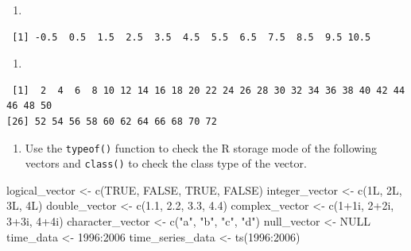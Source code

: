 \documentclass[
  letterpaper,
  DIV=11,
  numbers=noendperiod]{scrreprt}
\newenvironment{Shaded}{\begin{snugshade}}{\end{snugshade}}
\newcommand{\ConstantTok}[1]{\textcolor[rgb]{0.56,0.35,0.01}{#1}}
\newcommand{\DecValTok}[1]{\textcolor[rgb]{0.68,0.00,0.00}{#1}}
\newcommand{\FloatTok}[1]{\textcolor[rgb]{0.68,0.00,0.00}{#1}}
\newcommand{\FunctionTok}[1]{\textcolor[rgb]{0.28,0.35,0.67}{#1}}
\newcommand{\NormalTok}[1]{\textcolor[rgb]{0.00,0.23,0.31}{#1}}
\newcommand{\OtherTok}[1]{\textcolor[rgb]{0.00,0.23,0.31}{#1}}
\newcommand{\SpecialCharTok}[1]{\textcolor[rgb]{0.37,0.37,0.37}{#1}}
\newcommand{\StringTok}[1]{\textcolor[rgb]{0.13,0.47,0.30}{#1}}
\providecommand{\tightlist}{%
  \setlength{\itemsep}{0pt}\setlength{\parskip}{0pt}}\usepackage{longtable,booktabs,array}
\begin{document}
\begin{enumerate}
\def\labelenumi{\roman{enumi}.}
\setcounter{enumi}{6}
\tightlist
\item
\end{enumerate}

\begin{verbatim}
 [1] -0.5  0.5  1.5  2.5  3.5  4.5  5.5  6.5  7.5  8.5  9.5 10.5
\end{verbatim}

\begin{enumerate}
\def\labelenumi{\roman{enumi}.}
\setcounter{enumi}{7}
\tightlist
\item
\end{enumerate}

\begin{verbatim}
 [1]  2  4  6  8 10 12 14 16 18 20 22 24 26 28 30 32 34 36 38 40 42 44 46 48 50
[26] 52 54 56 58 60 62 64 66 68 70 72
\end{verbatim}

\begin{enumerate}
\def\labelenumi{\arabic{enumi}.}
\setcounter{enumi}{1}
\tightlist
\item
  Use the \texttt{typeof()} function to check the R storage mode of the
  following vectors and \texttt{class()} to check the class type of the
  vector.
\end{enumerate}

\begin{Shaded}
\begin{Highlighting}[]
\NormalTok{logical\_vector }\OtherTok{\textless{}{-}} \FunctionTok{c}\NormalTok{(}\ConstantTok{TRUE}\NormalTok{, }\ConstantTok{FALSE}\NormalTok{, }\ConstantTok{TRUE}\NormalTok{, }\ConstantTok{FALSE}\NormalTok{)}
\NormalTok{integer\_vector }\OtherTok{\textless{}{-}} \FunctionTok{c}\NormalTok{(}\DecValTok{1}\NormalTok{L, }\DecValTok{2}\NormalTok{L, }\DecValTok{3}\NormalTok{L, }\DecValTok{4}\NormalTok{L)}
\NormalTok{double\_vector }\OtherTok{\textless{}{-}} \FunctionTok{c}\NormalTok{(}\FloatTok{1.1}\NormalTok{, }\FloatTok{2.2}\NormalTok{, }\FloatTok{3.3}\NormalTok{, }\FloatTok{4.4}\NormalTok{)}
\NormalTok{complex\_vector }\OtherTok{\textless{}{-}} \FunctionTok{c}\NormalTok{(}\DecValTok{1}\SpecialCharTok{+}\DecValTok{1}\NormalTok{i, }\DecValTok{2}\SpecialCharTok{+}\DecValTok{2}\NormalTok{i, }\DecValTok{3}\SpecialCharTok{+}\DecValTok{3}\NormalTok{i, }\DecValTok{4}\SpecialCharTok{+}\DecValTok{4}\NormalTok{i)}
\NormalTok{character\_vector }\OtherTok{\textless{}{-}} \FunctionTok{c}\NormalTok{(}\StringTok{"a"}\NormalTok{, }\StringTok{"b"}\NormalTok{, }\StringTok{"c"}\NormalTok{, }\StringTok{"d"}\NormalTok{)}
\NormalTok{null\_vector }\OtherTok{\textless{}{-}} \ConstantTok{NULL}
\NormalTok{time\_data }\OtherTok{\textless{}{-}} \DecValTok{1996}\SpecialCharTok{:}\DecValTok{2006}
\NormalTok{time\_series\_data }\OtherTok{\textless{}{-}} \FunctionTok{ts}\NormalTok{(}\DecValTok{1996}\SpecialCharTok{:}\DecValTok{2006}\NormalTok{)}
\end{Highlighting}
\end{Shaded}
\end{document}
